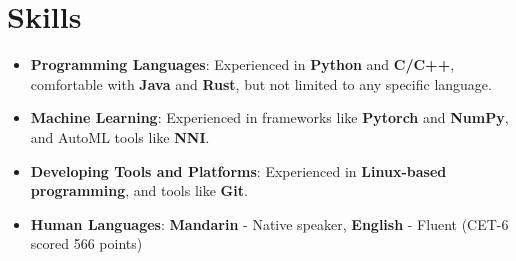\documentclass{resume}
\begin{document}




\section{\faCogs \: Skills}
\begin{itemize}[parsep=0.5ex]
    \item \textbf{Programming Languages}: Experienced in \textbf{Python} and \textbf{C/C++}, comfortable with \textbf{Java} and \textbf{Rust}, but not limited to any specific language.
    \item \textbf{Machine Learning}: Experienced in frameworks like \textbf{Pytorch} and \textbf{NumPy}, and AutoML tools like \textbf{NNI}.
    \item \textbf{Developing Tools and Platforms}: Experienced in \textbf{Linux-based programming}, and tools like \textbf{Git}.
    \item \textbf{Human Languages}: \textbf{Mandarin} - Native speaker,  \textbf{English} - Fluent (CET-6 scored 566 points)
\end{itemize}
\end{document}
